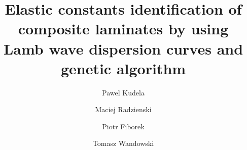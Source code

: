 \documentclass[preprint,12pt]{elsarticle}
\begin{document}
	\begin{frontmatter}

		\title{Elastic constants identification of composite laminates by using Lamb wave dispersion curves and genetic algorithm}

		\address[IFFM]{Institute of Fluid Flow Machinery, Polish Academy of Sciences, Poland}


		\author{Pawel Kudela}
		\author{Maciej Radzienski}
		\author{Piotr Fiborek }
		\author{Tomasz Wandowski }	


\end{frontmatter}
\end{document}
